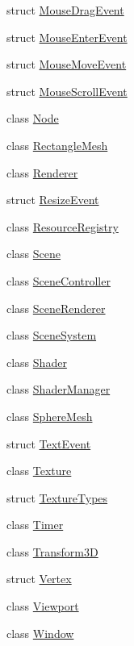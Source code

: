 \begin{DoxyCompactItemize}
\item 
struct \mbox{\hyperlink{structec_1_1_mouse_drag_event}{Mouse\+Drag\+Event}}
\item 
struct \mbox{\hyperlink{structec_1_1_mouse_enter_event}{Mouse\+Enter\+Event}}
\item 
struct \mbox{\hyperlink{structec_1_1_mouse_move_event}{Mouse\+Move\+Event}}
\item 
struct \mbox{\hyperlink{structec_1_1_mouse_scroll_event}{Mouse\+Scroll\+Event}}
\item 
class \mbox{\hyperlink{classec_1_1_node}{Node}}
\item 
class \mbox{\hyperlink{classec_1_1_rectangle_mesh}{Rectangle\+Mesh}}
\item 
class \mbox{\hyperlink{classec_1_1_renderer}{Renderer}}
\item 
struct \mbox{\hyperlink{structec_1_1_resize_event}{Resize\+Event}}
\item 
class \mbox{\hyperlink{classec_1_1_resource_registry}{Resource\+Registry}}
\item 
class \mbox{\hyperlink{classec_1_1_scene}{Scene}}
\item 
class \mbox{\hyperlink{classec_1_1_scene_controller}{Scene\+Controller}}
\item 
class \mbox{\hyperlink{classec_1_1_scene_renderer}{Scene\+Renderer}}
\item 
class \mbox{\hyperlink{classec_1_1_scene_system}{Scene\+System}}
\item 
class \mbox{\hyperlink{classec_1_1_shader}{Shader}}
\item 
class \mbox{\hyperlink{classec_1_1_shader_manager}{Shader\+Manager}}
\item 
class \mbox{\hyperlink{classec_1_1_sphere_mesh}{Sphere\+Mesh}}
\item 
struct \mbox{\hyperlink{structec_1_1_text_event}{Text\+Event}}
\item 
class \mbox{\hyperlink{classec_1_1_texture}{Texture}}
\item 
struct \mbox{\hyperlink{structec_1_1_texture_types}{Texture\+Types}}
\item 
class \mbox{\hyperlink{classec_1_1_timer}{Timer}}
\item 
class \mbox{\hyperlink{classec_1_1_transform3_d}{Transform3D}}
\item 
struct \mbox{\hyperlink{structec_1_1_vertex}{Vertex}}
\item 
class \mbox{\hyperlink{classec_1_1_viewport}{Viewport}}
\item 
class \mbox{\hyperlink{classec_1_1_window}{Window}}
\end{DoxyCompactItemize}
